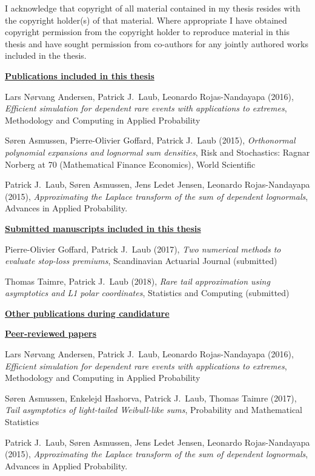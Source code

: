 I acknowledge that copyright of all material contained in my thesis resides with
the copyright holder(s) of that material. Where appropriate I have obtained
copyright permission from the copyright holder to reproduce material in this
thesis and have sought permission from co-authors for any jointly authored works
included in the thesis.


\newpage
{\bf \underline{Publications included in this thesis}}

Lars N{\o}rvang Andersen, Patrick J.\ Laub, Leonardo Rojas-Nandayapa (2016), \emph{Efficient simulation for dependent rare events with applications to extremes}, Methodology and Computing in Applied Probability

S{\o}ren Asmussen, Pierre-Olivier Goffard, Patrick J.\ Laub (2015), \emph{Orthonormal polynomial expansions and lognormal sum densities}, Risk and Stochastics: Ragnar Norberg at 70 (Mathematical Finance Economics), World Scientific

Patrick J.\ Laub, S{\o}ren Asmussen, Jens Ledet Jensen, Leonardo Rojas-Nandayapa (2015), \emph{Approximating the Laplace transform of the sum of dependent lognormals}, Advances in Applied Probability.

\newpage
{\bf \underline{Submitted manuscripts included in this thesis}}

Pierre-Olivier Goffard, Patrick J.\ Laub (2017), \emph{Two numerical methods to evaluate stop-loss premiums}, Scandinavian Actuarial Journal (submitted)

Thomas Taimre, Patrick J.\ Laub (2018), \emph{Rare tail approximation using asymptotics and L1 polar coordinates}, Statistics and Computing (submitted)

{\bf \underline{Other publications during candidature}}

{\small \bf \underline{Peer-reviewed papers}}

Lars N{\o}rvang Andersen, Patrick J.\ Laub, Leonardo Rojas-Nandayapa (2016), \emph{Efficient simulation for dependent rare events with applications to extremes}, Methodology and Computing in Applied Probability

S{\o}ren Asmussen, Enkelejd Hashorva, Patrick J.\ Laub, Thomas Taimre (2017), \emph{Tail asymptotics of light-tailed Weibull-like sums}, Probability and Mathematical Statistics

Patrick J.\ Laub, S{\o}ren Asmussen, Jens Ledet Jensen, Leonardo Rojas-Nandayapa (2015), \emph{Approximating the Laplace transform of the sum of dependent lognormals}, Advances in Applied Probability.


